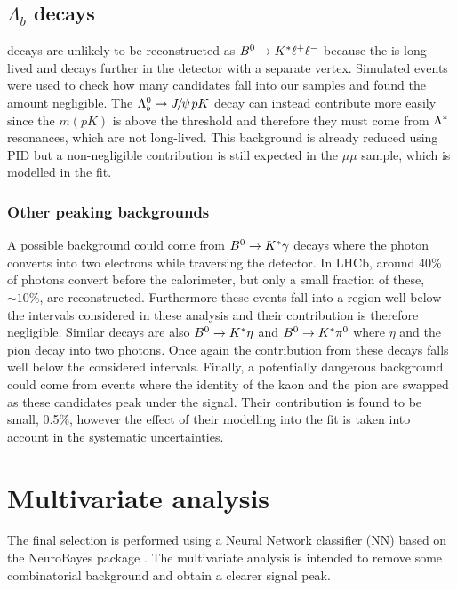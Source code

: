 \subsection{$\Lambda_b$ decays}

\Lb\to\Lz\jpsi decays are unlikely to be reconstructed as ${{B}^0} \rightarrow {\ensuremath{{K}^*}} \ell^+\ell^-$ because
the \Lz is long-lived and decays further in the detector with a separate vertex.
Simulated events were used to check how many candidates fall into our \Bz samples and found the amount negligible. 
The $\Lb\to\jpsi pK$ decay can instead contribute more easily since the $m(pK)$ is above the \Lz threshold
and therefore they must come from ${\Lambda}^*$ resonances, which are not long-lived. This background is already
reduced using PID but a non-negligible contribution is still expected in the $\mu\mu$ sample, which is modelled in the fit.

\subsubsection{Other peaking backgrounds}

A possible background could come from ${{B}^0} \rightarrow{\ensuremath{{K}^*}}\gamma$ decays where the photon converts
into two electrons while traversing the detector. In LHCb, around 40\% of photons convert before the calorimeter,
but only a small fraction of these, $\sim 10\%$, are reconstructed. Furthermore these events fall
into a \qsq region well below the intervals considered in these analysis and their contribution is therefore negligible.
Similar decays are also $\Bz \to\Kstar\eta$ and $\Bz \to\Kstar\pi^0$ where $\eta$ and the pion decay into
two photons. Once again the contribution from these decays falls well below the considered \qsq intervals.
Finally, a potentially dangerous background could come from events where the
identity of the kaon and the pion are swapped as these candidates peak under the signal.
Their contribution is found to be small, 0.5\%, however the effect of their modelling into the fit
is taken into account in the systematic uncertainties.


\section{Multivariate analysis}

The final selection is performed using a Neural Network classifier (NN) based on the NeuroBayes
package \cite{Feindt:2006pm,feindt-2004}. The multivariate analysis is intended to remove
some combinatorial background and obtain a clearer signal peak.


